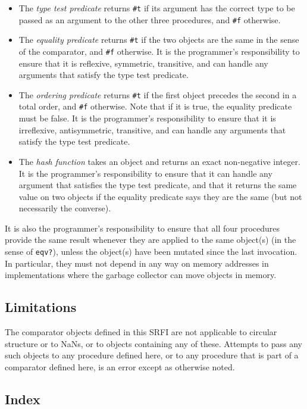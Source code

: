 \begin{itemize}
\item
  The \emph{type test predicate} returns \texttt{\#t} if its argument
  has the correct type to be passed as an argument to the other three
  procedures, and \texttt{\#f} otherwise.
\item
  The \emph{equality predicate} returns \texttt{\#t} if the two objects
  are the same in the sense of the comparator, and \texttt{\#f}
  otherwise. It is the programmer's responsibility to ensure that it is
  reflexive, symmetric, transitive, and can handle any arguments that
  satisfy the type test predicate.
\item
  The \emph{ordering predicate} returns \texttt{\#t} if the first object
  precedes the second in a total order, and \texttt{\#f} otherwise. Note
  that if it is true, the equality predicate must be false. It is the
  programmer's responsibility to ensure that it is irreflexive,
  antisymmetric, transitive, and can handle any arguments that satisfy
  the type test predicate.
\item
  The \emph{hash function} takes an object and returns an exact
  non-negative integer. It is the programmer's responsibility to ensure
  that it can handle any argument that satisfies the type test
  predicate, and that it returns the same value on two objects if the
  equality predicate says they are the same (but not necessarily the
  converse).
\end{itemize}

It is also the programmer's responsibility to ensure that all four
procedures provide the same result whenever they are applied to the same
object(s) (in the sense of \texttt{eqv?}), unless the object(s) have
been mutated since the last invocation. In particular, they must not
depend in any way on memory addresses in implementations where the
garbage collector can move objects in memory.

\subsection{Limitations}

The comparator objects defined in this SRFI are not applicable to
circular structure or to NaNs, or to objects containing any of these.
Attempts to pass any such objects to any procedure defined here, or to
any procedure that is part of a comparator defined here, is an error
except as otherwise noted.

\subsection{Index}

